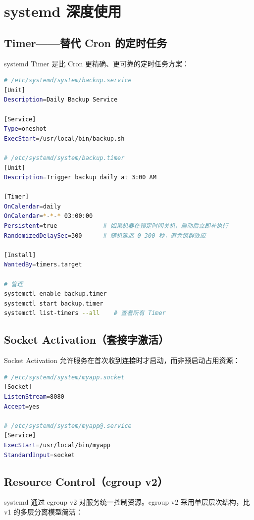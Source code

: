 \documentclass[12pt,UTF8]{ctexbook}
\begin{document}
\section{systemd 深度使用}
\label{sec:systemd-advanced}

\subsection*{Timer——替代 Cron 的定时任务}

systemd Timer 是比 Cron 更精确、更可靠的定时任务方案：

\begin{lstlisting}[language=bash]
# /etc/systemd/system/backup.service
[Unit]
Description=Daily Backup Service

[Service]
Type=oneshot
ExecStart=/usr/local/bin/backup.sh

# /etc/systemd/system/backup.timer
[Unit]
Description=Trigger backup daily at 3:00 AM

[Timer]
OnCalendar=daily
OnCalendar=*-*-* 03:00:00
Persistent=true             # 如果机器在预定时间关机，启动后立即补执行
RandomizedDelaySec=300      # 随机延迟 0-300 秒，避免惊群效应

[Install]
WantedBy=timers.target

# 管理
systemctl enable backup.timer
systemctl start backup.timer
systemctl list-timers --all    # 查看所有 Timer
\end{lstlisting}

\subsection*{Socket Activation（套接字激活）}

Socket Activation 允许服务在首次收到连接时才启动，而非预启动占用资源：

\begin{lstlisting}[language=bash]
# /etc/systemd/system/myapp.socket
[Socket]
ListenStream=8080
Accept=yes

# /etc/systemd/system/myapp@.service
[Service]
ExecStart=/usr/local/bin/myapp
StandardInput=socket
\end{lstlisting}

\subsection*{Resource Control（cgroup v2）}

systemd 通过 cgroup v2 对服务统一控制资源。cgroup v2 采用单层层次结构，比 v1 的多层分离模型简洁：
\end{document}
